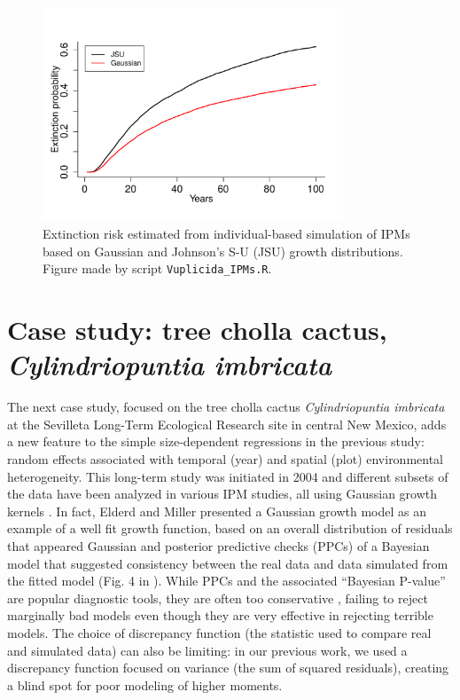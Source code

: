 \documentclass[12pt]{article}
\begin{document}
\begin{spacing}{1.9}
\begin{figure}[tbp]
	\centering
	\includegraphics[width=0.8\textwidth]{figures/lichen_extinction_risk}
	\caption{Extinction risk estimated from individual-based simulation of IPMs based on Gaussian and Johnson's S-U (JSU) growth distributions. Figure made by script \texttt{Vuplicida\_IPMs.R}.}
	\label{fig:lichen_extinction}
\end{figure} 


\section{Case study: tree cholla cactus, \emph{Cylindriopuntia imbricata}}
\label{sec:cactusCaseStudy} 
The next case study, focused on the tree cholla cactus \emph{Cylindriopuntia imbricata} at the Sevilleta Long-Term Ecological Research site in central New Mexico, adds a new feature to the simple size-dependent regressions in the previous study: random effects associated with temporal (year) and spatial (plot) environmental heterogeneity. 
This long-term study was initiated in 2004 and different subsets of the data have been analyzed in various IPM studies, all using Gaussian growth kernels  \citep{miller2009impacts,czachurademographic,compagnoni2016effect,ohm2014balancing,elderd2016quantifying}.
In fact, Elderd and Miller \citeyear{elderd2016quantifying} presented a Gaussian growth model as an example of a well fit growth function, based on an overall distribution of residuals that appeared Gaussian and posterior predictive checks (PPCs) of a Bayesian model that suggested consistency between the real data and data simulated from the fitted model (Fig. 4 in \citep{elderd2016quantifying}). 
While PPCs and the associated ``Bayesian P-value'' are popular diagnostic tools, they are often too conservative \citep{conn2018guide,zhang2014comparative}, failing to reject marginally bad models even though they are very effective in rejecting terrible models.
The choice of discrepancy function (the statistic used to compare real and simulated data) can also be limiting: in our previous work, we used a discrepancy function focused on variance (the sum of squared residuals), creating a blind spot for poor modeling of higher moments.


\end{spacing}
\end{document}
